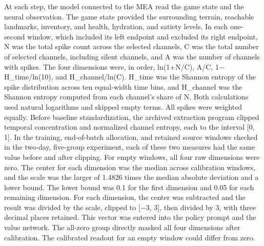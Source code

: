 \documentclass{article}
\begin{document}
At each step, the model connected to the MEA read the game state and the neural observation. The game state provided the surrounding terrain, reachable landmarks, inventory, and health, hydration, and satiety levels. In each one-second window, which included its left endpoint and excluded its right endpoint, N was the total spike count across the selected channels, C was the total number of selected channels, including silent channels, and A was the number of channels with spikes. The four dimensions were, in order, ln(1+N/C), A/C, 1\ensuremath{-}H\_\allowbreak{}time/ln(10), and H\_\allowbreak{}channel/ln(C). H\_\allowbreak{}time was the Shannon entropy of the spike distribution across ten equal-width time bins, and H\_\allowbreak{}channel was the Shannon entropy computed from each channel’s share of N. Both calculations used natural logarithms and skipped empty terms. All spikes were weighted equally. Before baseline standardization, the archived extraction program clipped temporal concentration and normalized channel entropy, each to the interval [0, 1]. In the training, end-of-batch allocation, and retained source windows checked in the two-day, five-group experiment, each of these two measures had the same value before and after clipping. For empty windows, all four raw dimensions were zero. The center for each dimension was the median across calibration windows, and the scale was the larger of 1.4826 times the median absolute deviation and a lower bound. The lower bound was 0.1 for the first dimension and 0.05 for each remaining dimension. For each dimension, the center was subtracted and the result was divided by the scale, clipped to [\ensuremath{-}3, 3], then divided by 3, with three decimal places retained. This vector was entered into the policy prompt and the value network. The all-zero group directly masked all four dimensions after calibration. The calibrated readout for an empty window could differ from zero.
\end{document}
